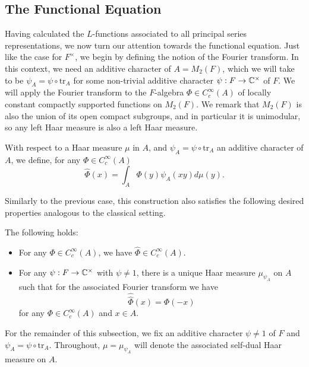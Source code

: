 \subsection{The Functional Equation}

Having calculated the $L$-functions associated to all principal series representations, we now turn our attention towards the functional equation. Just like the case for $F^\times$, we begin by defining the notion of the Fourier transform. In this context, we need an additive character of $A=M_2(F)$, which we will take to be $\psi_A = \psi \circ \mathrm{tr}_A$ for some non-trivial additive character $\psi : F \to \mathbb{C}^\times$ of $F$. We will apply the Fourier transform to the $F$-algebra $\Phi \in C_c^\infty(A)$ of locally constant compactly supported functions on $M_2(F)$. We remark that $M_2(F)$ is also the union of its open compact subgroups, and in particular it is unimodular, so any left Haar measure is also a left Haar measure.

\begin{defn}
    With respect to a Haar measure $\mu$ in $A$, and $\psi_A=\psi \circ \mathrm{tr}_A$ an additive character of $A$, we define, for any $\Phi \in C_c^\infty(A)$
    $$\hat{\Phi}(x) = \int_A\Phi(y) \psi_A(xy)d\mu(y).$$
\end{defn}

Similarly to the previous case, this construction also satisfies the following desired properties analogous to the classical setting.

\begin{prop}
    The following holds:
    \begin{itemize}
        \item For any $\Phi \in C_c^\infty(A)$, we have $\hat{\Phi} \in C_c^\infty(A)$.
        \item For any $\psi: F \to \mathbb{C}^\times$ with $\psi \neq 1$, there is a unique Haar measure $\mu_{\psi_A}$ on $A$ such that for the associated Fourier transform we have $$\hat{\hat{\Phi}}(x) = \Phi(-x)$$ for any $\Phi \in C_c^\infty(A)$ and $x \in A$.
    \end{itemize}
    
\end{prop}

\begin{notn}
    For the remainder of this subsection, we fix an additive character $\psi \neq 1$ of $F$ and $\psi_A = \psi \circ \mathrm{tr}_A$. Throughout, $\mu= \mu_{\psi_A}$ will denote the associated self-dual Haar measure on $A$.
\end{notn}

